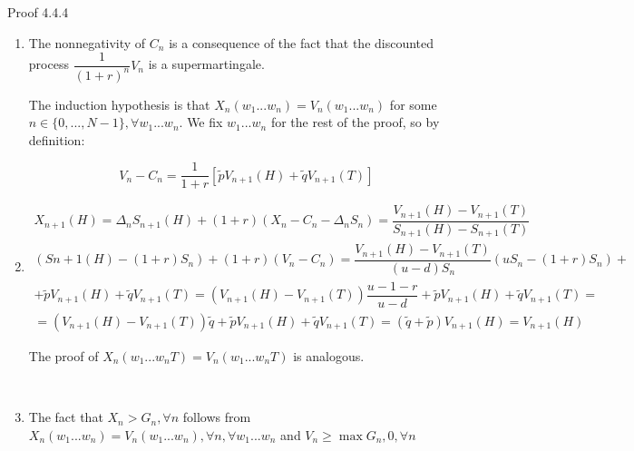 \documentclass[c, dvipsnames, 8pt]{beamer}
\begin{document}
	
\begin{frame}[shrink=5]
\frametitle{\insertsection} 
\framesubtitle{\insertsubsection} 



\begin{block}{Proof 4.4.4}
\end{block}

\begin{enumerate}
	\item  The nonnegativity of $C_n$ is a consequence of the fact that the discounted process $\dfrac{1}{(1+r)^n}V_n$ is a supermartingale.

 The induction hypothesis is that  $X_n(w_1...w_n) = V_n(w_1...w_n)$ for some $n \in \{0, ..., N-1\},   \forall w_1...w_n. $ We fix $w_1...w_n$  for the rest of the proof, so by definition: 


\begin{equation}\label{key}
V_n - C_n = \dfrac{1}{1+r  } [\tilde{p}V_{n+1}(H)  + \tilde{q}V_{n+1}(T) ]
\end{equation}



\item \begin{multline}
X_{n+1}(H) = \Delta_n S_{n+1}(H) + (1+r) (X_n-C_n-\Delta_n S_{n}) =  \dfrac{V_{n+1}(H) -V_{n+1}(T)   }{S_{n+1}(H) -S_{n+1}(T) } \\  (Sn+1(H)-(1+r)S_n)+(1+r)(V_n-C_n)= \dfrac{V_{n+1}(H) -V_{n+1}(T)   }{(u-d)S_{n} } (uS_n-(1+r)S_n)+ \\ + \tilde{p}V_{n+1}(H) +\tilde{q}V_{n+1}(T) = (V_{n+1}(H)-V_{n+1}(T)) \dfrac{u-1-r}{u-d} + \tilde{p}V_{n+1}(H) +\tilde{q}V_{n+1}(T) = \\ = (V_{n+1}(H)-V_{n+1}(T)) \tilde{q} + \tilde{p}V_{n+1}(H) +\tilde{q}V_{n+1}(T) = (\tilde{q} + \tilde{p})  V_{n+1}(H) =  V_{n+1}(H)
 \end{multline}

The proof of  $X_n(w_1...w_nT) = V_n(w_1...w_nT)$ is  analogous.

\

\item The fact that  $X_n > G_n, \forall n$  follows from $X_n(w_1...w_n) = V_n(w_1...w_n), \forall n, \forall w_1...w_n$  and
$V_n \geq \max{G_n,0} , \forall n$

\end{enumerate}

\end{frame}	
\end{document}
